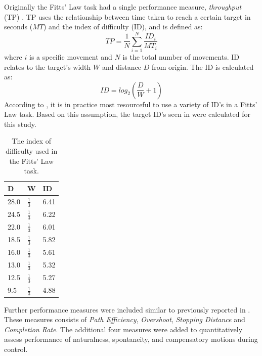 Originally the Fitts' Law task had a single performance measure, \textit{throughput} (TP) \cite{Fitts1954}. TP uses the relationship between time taken to reach a certain target in seconds ($MT$) and the index of difficulty (ID), and is defined as:
\vspace{-0.1cm}
\begin{equation} \label{eq:TP}
TP=\frac{1}{N}\sum_{i=1}^{N} \frac{ID_i}{MT_i} 
\end{equation}
\vspace{-0.1cm}
where $i$ is a specific movement and $N$ is the total number of movements. ID relates to the target's width $W$ and distance $D$ from origin. The ID is calculated as: 
\vspace{-0.1cm}
\begin{equation} \label{eq:ID}
ID=log_2(\frac{D}{W}+1)
\end{equation}
\vspace{-0.08cm}
According to \cite{Scheme2013a}, it is in practice most resourceful to use a variety of ID's in a Fitts' Law task. Based on this assumption, the target ID's seen in  were calculated for this study.

\begin{table}[H]
	\centering
	\caption{The index of difficulty used in the Fitts' Law task.}
	\label{tab:P:ID}
	\begin{tabular}{l|l|l}
		
		D		 & W	         & ID				   \\ \hline
		28.0     & $\frac{1}{3}$ & 6.41                \\ \hline
		24.5     & $\frac{1}{3}$ & 6.22                \\ \hline
		22.0     & $\frac{1}{3}$ & 6.01                \\ \hline
		18.5     & $\frac{1}{3}$ & 5.82                \\ \hline
		16.0     & $\frac{1}{3}$ & 5.61                \\ \hline
		13.0     & $\frac{1}{3}$ & 5.32                \\ \hline
		12.5     & $\frac{1}{3}$ & 5.27                \\ \hline
		9.5      & $\frac{1}{3}$ & 4.88                \\ \hline
	\end{tabular}
\end{table}

Further performance measures were included similar to previously reported in \cite{Scheme2013, Scheme2013a}. These measures consists of \textit{Path Efficiency}, \textit{Overshoot}, \textit{Stopping Distance} and \textit{Completion Rate}. The additional four measures were added to quantitatively assess performance of naturalness, spontaneity, and compensatory motions during control.  